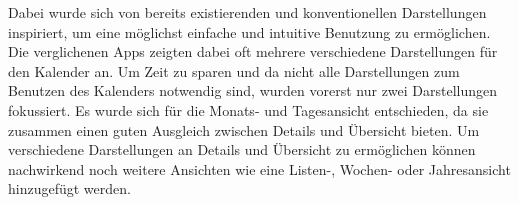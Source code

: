 \begin{itemize}
		Dabei wurde sich von bereits existierenden und konventionellen Darstellungen inspiriert, um eine möglichst einfache und intuitive Benutzung zu ermöglichen. Die verglichenen Apps zeigten dabei oft mehrere verschiedene Darstellungen für den Kalender an. %
		Um Zeit zu sparen und da nicht alle Darstellungen zum Benutzen des Kalenders notwendig sind, wurden vorerst nur zwei Darstellungen fokussiert. Es wurde sich für die Monats- und Tagesansicht entschieden, da sie zusammen einen guten Ausgleich zwischen Details und Übersicht bieten.\newline%
		Um verschiedene Darstellungen an Details und Übersicht zu ermöglichen können nachwirkend noch weitere Ansichten wie eine Listen-, Wochen- oder Jahresansicht hinzugefügt werden.%


\end{itemize}
